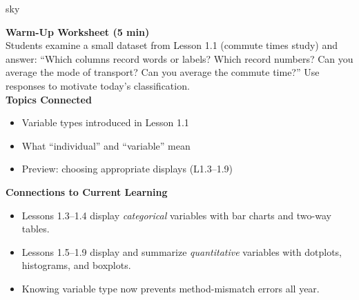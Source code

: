 \documentclass[10pt]{article}
\begin{document}
\begin{skillbox}{sky}
\begin{minipage}[t]{0.48\linewidth}
    \textbf{Warm-Up Worksheet (5 min)}\\
    Students examine a small dataset from Lesson 1.1 (commute times study) and
    answer: ``Which columns record words or labels? Which record numbers?
    Can you average the mode of transport? Can you average the commute time?''
    Use responses to motivate today's classification.\\[6pt]
    \textbf{Topics Connected}
    \begin{itemize}
        \item[\rule{0.7cm}{0.4pt}] Variable types introduced in Lesson 1.1
        \item[\rule{0.7cm}{0.4pt}] What ``individual'' and ``variable'' mean
        \item[\rule{0.7cm}{0.4pt}] Preview: choosing appropriate displays (L1.3--1.9)
    \end{itemize}
\end{minipage}
\hfill
\begin{minipage}[t]{0.48\linewidth}
    \textbf{Connections to Current Learning}
    \begin{itemize}
        \item Lessons 1.3--1.4 display \textit{categorical} variables with bar
              charts and two-way tables.
        \item Lessons 1.5--1.9 display and summarize \textit{quantitative}
              variables with dotplots, histograms, and boxplots.
        \item Knowing variable type now prevents method-mismatch errors
              all year.
    \end{itemize}
\end{minipage}
\end{skillbox}
\end{document}
